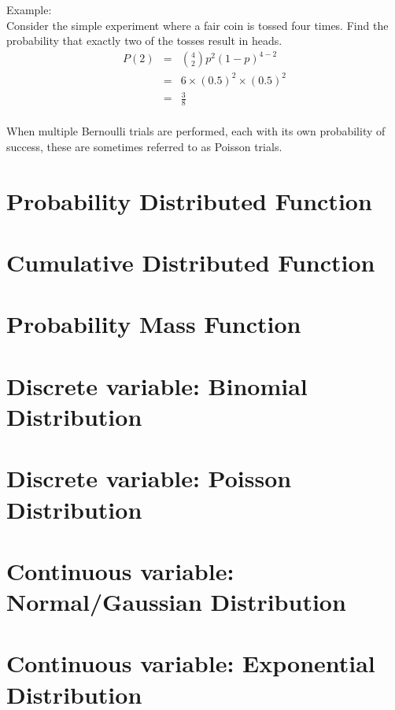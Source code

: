 Example:\\
Consider the simple experiment where a fair coin is tossed four times. Find the probability that exactly two of the tosses result in heads.\\
\begin{eqnarray*}
P(2) &=& \binom{4}{2}p^2 (1-p)^{4-2} \\ 
&=& 6 \times (0.5)^2 \times (0.5)^2 \\ 
&=& \frac{3}{8}\\ 
\label{coin}
\end{eqnarray*}

When multiple Bernoulli trials are performed, each with its own probability of success, these are sometimes referred to as Poisson trials.

\section{Probability Distributed Function}

\section{Cumulative Distributed Function}

\section{Probability Mass Function}

\section{Discrete variable: Binomial Distribution}

\section{Discrete variable: Poisson Distribution}

\section{Continuous variable: Normal/Gaussian Distribution}

\section{Continuous variable: Exponential Distribution}



